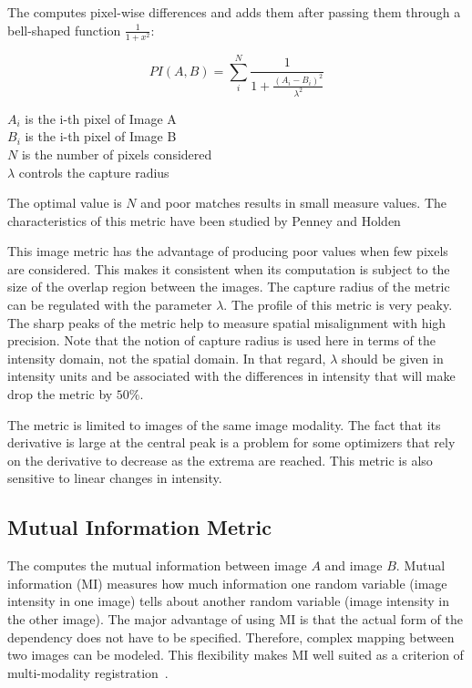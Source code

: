 The  computes
pixel-wise differences and adds them after passing them through a bell-shaped
function $\frac{1}{1+x^2}$:

\begin{equation}
PI(A,B) =  \sum_i^N \frac{ 1 }{ 1 + \frac{ \left( A_i - B_i \right) ^ 2}{ \lambda^2 }  }
\end{equation}
\begin{center}
$A_i$ is the i-th pixel of Image A \\
$B_i$ is the i-th pixel of Image B \\
$N$ is the number of pixels considered \\
$\lambda$ controls the capture radius
\end{center}

The optimal value is $N$ and poor matches results in small measure values.
The characteristics of this metric have been studied by Penney and Holden
\cite{Holden1999}\cite{Penney1998}

This image metric has the advantage of producing poor values when few pixels
are considered.  This makes it consistent when its computation is subject to
the size of the overlap region between the images. The capture radius of the
metric can be regulated with the parameter $\lambda$.  The profile of this
metric is very peaky. The sharp peaks of the metric help to measure spatial
misalignment with high precision. Note that the notion of capture radius is
used here in terms of the intensity domain, not the spatial domain. In that
regard, $\lambda$ should be given in intensity units and be associated with
the differences in intensity that will make drop the metric by $50\%$.

The metric is limited to images of the same image modality.  The
fact that its derivative is large at the central peak is a problem for some
optimizers that rely on the derivative to decrease as the extrema are
reached.  This metric is also sensitive to linear changes in intensity.


\subsection{Mutual Information Metric}
\label{sec:MutualInformationMetric}

The  computes the mutual
information between image $A$ and image $B$.  Mutual information (MI)
measures how much information one random variable (image intensity in one
image) tells about another random variable (image intensity in the other
image). The major advantage of using MI is that the actual form of the
dependency does not have to be specified.  Therefore, complex mapping between
two images can be modeled.  This flexibility makes MI well suited as a
criterion of multi-modality registration~\cite{Pluim2003}.

